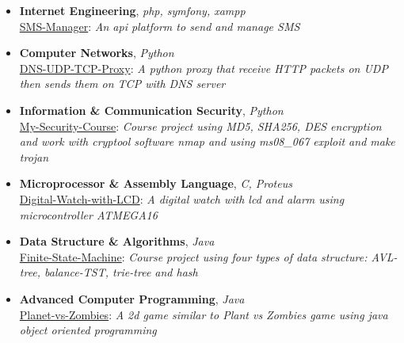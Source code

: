 \documentclass[margin]{res}
\begin{document}
\begin{resume}
\begin{itemize} \itemsep +3pt

\item \textbf{Internet Engineering}, {\sl php, symfony, xampp}\\
\href{https://github.com/aliyazdi75/sms-manager}{SMS-Manager}: \textit{An api platform to send and manage SMS}

\item \textbf{Computer Networks}, {\sl Python}\\
\href{https://github.com/aliyazdi75/DNS-UDP-TCP-Proxy}{DNS-UDP-TCP-Proxy}: \textit{A python proxy that receive HTTP packets on UDP then sends them on TCP with DNS server}

\item \textbf{Information \& Communication Security}, {\sl Python}\\
\href{https://github.com/aliyazdi75/My-Security-Course}{My-Security-Course}: \textit{Course project using MD5, SHA256, DES encryption and work with cryptool software nmap and using ms08\_067 exploit and make trojan}

\item \textbf{Microprocessor \& Assembly Language}, {\sl C, Proteus}\\
\href{https://github.com/aliyazdi75/Digital-Watch-with-LCD}{Digital-Watch-with-LCD}: \textit{A digital watch with lcd and alarm using microcontroller ATMEGA16}



\item \textbf{Data Structure \& Algorithms}, {\sl Java}\\
\href{https://github.com/aliyazdi75/Finite-State-Machine}{Finite-State-Machine}: \textit{Course project using four types of data structure: AVL-tree, balance-TST, trie-tree and hash}

\item \textbf{Advanced Computer Programming}, {\sl Java}\\
\href{https://github.com/aliyazdi75/Planet\_vs\_Zombies}{Planet-vs-Zombies}: \textit{A 2d game similar to Plant vs Zombies game using java object oriented programming}


\end{itemize}
\end{resume}
\end{document}
